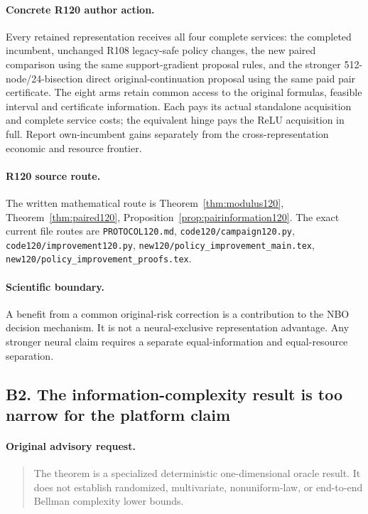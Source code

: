 \paragraph{Concrete R120 author action.}
Every retained representation receives all four complete services: the completed incumbent, unchanged R108 legacy-safe policy changes, the new paired comparison using the same support-gradient proposal rules, and the stronger 512-node/24-bisection direct original-continuation proposal using the same paid pair certificate. The eight arms retain common access to the original formulas, feasible interval and certificate information. Each pays its actual standalone acquisition and complete service costs; the equivalent hinge pays the ReLU acquisition in full. Report own-incumbent gains separately from the cross-representation economic and resource frontier.
\paragraph{R120 source route.}
The written mathematical route is Theorem~\ref{thm:modulus120}, Theorem~\ref{thm:paired120}, Proposition~\ref{prop:pairinformation120}. The exact current file routes are \nolinkurl{PROTOCOL120.md}, \nolinkurl{code120/campaign120.py}, \nolinkurl{code120/improvement120.py}, \nolinkurl{new120/policy_improvement_main.tex}, \nolinkurl{new120/policy_improvement_proofs.tex}.
\paragraph{Scientific boundary.}
A benefit from a common original-risk correction is a contribution to the NBO decision mechanism. It is not a neural-exclusive representation advantage. Any stronger neural claim requires a separate equal-information and equal-resource separation.

\subsection{B2. The information-complexity result is too narrow for the platform claim}
\label{response120:B2}
\paragraph{Original advisory request.}
\begin{quote}
The theorem is a specialized deterministic one-dimensional oracle result. It does not establish randomized, multivariate, nonuniform-law, or end-to-end Bellman complexity lower bounds.
\end{quote}
